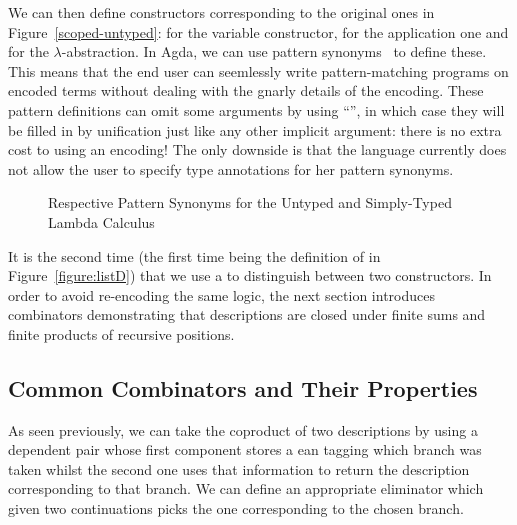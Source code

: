 We can then define constructors corresponding
to the original ones in Figure~\ref{scoped-untyped}: 
for  the variable constructor,  for  the
application one and  for  the $\lambda$-abstraction.
In Agda, we can use pattern synonyms~\cite{Pickering:patsyn} to define these.
This means that the end user can seemlessly write pattern-matching programs on
encoded terms without dealing with the gnarly details of the encoding.
These pattern definitions can omit some arguments by using ``\AS{\_}'',
in which case they will be filled in by unification just like any other
implicit argument: there is no extra cost to using an encoding!
The only downside is that the language currently does not allow the
user to specify type annotations for her pattern synonyms.

\begin{figure}[h]
\begin{minipage}{0.40\textwidth}
\end{minipage}\hspace{2em}
\begin{minipage}{0.50\textwidth}
\end{minipage}
\caption{Respective Pattern Synonyms for the Untyped and Simply-Typed Lambda Calculus}
\end{figure}

It is the second time (the first time being the definition of
 in Figure~\ref{figure:listD}) that we use a
 to distinguish between two constructors. In order
to avoid re-encoding the same logic,
the next section introduces combinators demonstrating that
descriptions are closed under finite sums and finite products
of recursive positions.

\subsection{Common Combinators and Their Properties}\label{desccomb}

As seen previously, we can take the coproduct  of two
descriptions by using a dependent pair whose first component
stores a ean tagging which branch was taken whilst
the second one uses that information to return the description
corresponding to that branch. We can define an appropriate
eliminator  which given two continuations picks the
one corresponding to the chosen branch.

